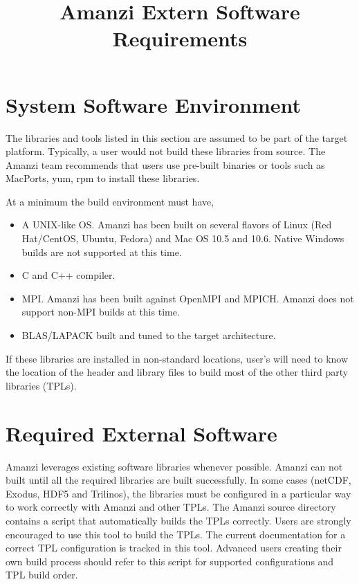 \documentclass[12pt]{article}
\begin{document}
\title{Amanzi Extern Software Requirements}

\maketitle


\section*{System Software Environment}
The libraries and tools listed in this section are assumed to be part of the target platform. Typically, 
a user would not build these libraries from source.  The Amanzi team recommends that users use
pre-built binaries or tools such as MacPorts, yum, rpm to install these libraries.  

At a minimum the build environment must have,
\begin{itemize}
\item A UNIX-like OS. Amanzi has been built on several flavors of Linux (Red Hat/CentOS, Ubuntu, Fedora) and 
Mac OS 10.5 and 10.6. Native Windows builds are not supported at this time.
\item C and C++ compiler.
\item MPI. Amanzi has been built against OpenMPI and MPICH. Amanzi does not support non-MPI builds at this time.
\item BLAS/LAPACK built and tuned to the target architecture.
\end{itemize}

If these libraries are installed in non-standard locations, user's will need to know the location 
of the header and library files to build most of the other third party libraries (TPLs).

\section*{Required External Software}
Amanzi leverages existing software libraries whenever possible. Amanzi can not built until all the required 
libraries are built successfully. In some cases (netCDF, Exodus, HDF5 and Trilinos), the libraries must be configured
in a particular way to work correctly with Amanzi and other TPLs. The Amanzi source directory contains a 
script that automatically builds the TPLs correctly. Users are strongly encouraged to use this tool to build the
TPLs. The current documentation for a correct TPL configuration is tracked in this tool. Advanced users creating
their own build process should refer to this script for supported configurations and TPL build order.
\end{document}
